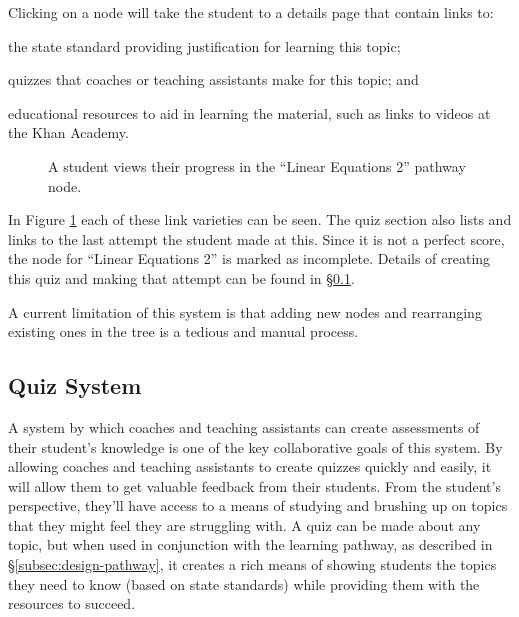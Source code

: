Clicking on a node will take the student to a details page that contain links to:
\begin{inparaenum}[\itshape 1\upshape)]
	\item the state standard providing justification for learning this topic;
	\item quizzes that coaches or teaching assistants make for this topic; and
	\item educational resources to aid in learning the material, such as links to videos at the Khan Academy.
\end{inparaenum}

\begin{figure}[h!]
	\centering
	\caption{A student views their progress in the ``Linear Equations 2'' pathway node.}
	\label{fig:screens-pathway-node}
\end{figure}

In Figure \ref{fig:screens-pathway-node} each of these link varieties can be seen. The quiz section also lists and links to the last attempt the student made at this. Since it is not a perfect score, the node for ``Linear Equations 2'' is marked as incomplete. Details of creating this quiz and making that attempt can be found in \S \ref{subsec:design-quiz}.

A current limitation of this system is that adding new nodes and rearranging existing ones in the tree is a tedious and manual process.

\subsection{Quiz System}
\label{subsec:design-quiz}
A system by which coaches and teaching assistants can create assessments of their student's knowledge is one of the key collaborative goals of this system. By allowing coaches and teaching assistants to create quizzes quickly and easily, it will allow them to get valuable feedback from their students. From the student's perspective, they'll have access to a means of studying and brushing up on topics that they might feel they are struggling with. A quiz can be made about any topic, but when used in conjunction with the learning pathway, as described in \S \ref{subsec:design-pathway}, it creates a rich means of showing students the topics they need to know (based on state standards) while providing them with the resources to succeed.

